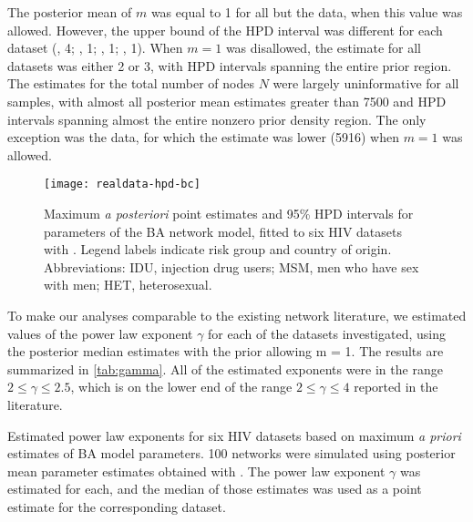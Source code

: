 The posterior mean of $m$ was equal to 1 for all but the
\citeauthor{novitsky2014impact} data, when this value was allowed. However, the
upper bound of the HPD interval was different for each dataset
  (\citeauthor{niculescu2015recent}, 4;
   \citeauthor{wang2015targeting}, 1;
   \citeauthor{li2015hiv}, 1;
   \citeauthor{cuevas2009hiv}, 1).
When $m = 1$ was disallowed, the estimate for all datasets was either 2 or 3,
with HPD intervals spanning the entire prior region. The estimates for the
total number of nodes $N$ were largely uninformative for all samples, with
almost all posterior mean estimates greater than 7500 and HPD intervals
spanning almost the entire nonzero prior density region. The only exception was
the \citeauthor{li2015hiv} data, for which the estimate was lower 
  (5916)
when $m = 1$ was allowed.

\begin{figure*}[ht]
  \centering
  \texttt{[image: realdata-hpd-bc]}
  \caption[
      Maximum \textit{a posteriori} point estimates and 95\% HPD intervals for
      parameters of the BA network model, fitted to six HIV datasets
      with .]
  {
      Maximum \textit{a posteriori} point estimates and 95\% HPD intervals for
      parameters of the BA network model, fitted to six HIV datasets with
      . Legend labels indicate risk group and country of
      origin. Abbreviations: IDU, injection drug users; MSM, men who have sex
      with men; HET, heterosexual.
  }
  \label{fig:abchpd}
\end{figure*}

To make our analyses comparable to the existing network literature, we
estimated values of the power law exponent $\gamma$ for each of the datasets 
investigated, using the posterior median estimates with the prior allowing
\gls{m} = 1. The results are summarized in \cref{tab:gamma}. All of the
estimated exponents were in the range $2 \leq \gamma \leq 2.5$, which is on the
lower end of the range $2 \leq \gamma \leq 4$ reported in the literature.

\begin{table}
    \centering
    
    \caption[
        Estimated power law exponents for six HIV datasets based on maximum
        \textit{a priori} estimates of BA model parameters.
    ]{
        Estimated power law exponents for six HIV datasets based on maximum
        \textit{a priori} estimates of BA model parameters. 100 networks were
        simulated using posterior mean parameter estimates obtained with
        . The power law exponent $\gamma$ was estimated for
        each, and the median of those estimates was used as a point estimate
        for the corresponding dataset.
    }
    \label{tab:gamma}
\end{table}
